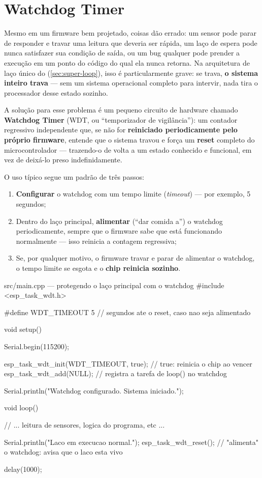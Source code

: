 \section{Watchdog Timer}
\label{sec:watchdog}

Mesmo em um firmware bem projetado, coisas dão errado: um sensor pode parar de responder e travar uma leitura que deveria ser rápida, um laço de espera pode nunca satisfazer sua condição de saída, ou um bug qualquer pode prender a execução em um ponto do código do qual ela nunca retorna. Na arquitetura de laço único do \ESP{} (\cref{sec:super-loop}), isso é particularmente grave: se  trava, \textbf{o sistema inteiro trava} — sem um sistema operacional completo para intervir, nada tira o processador desse estado sozinho.

A solução para esse problema é um pequeno circuito de hardware chamado \textbf{Watchdog Timer} (WDT, ou ``temporizador de vigilância''): um contador regressivo independente que, se não for \textbf{reiniciado periodicamente pelo próprio firmware}, entende que o sistema travou e força um \textbf{reset} completo do microcontrolador — trazendo-o de volta a um estado conhecido e funcional, em vez de deixá-lo preso indefinidamente.

O uso típico segue um padrão de três passos:

\begin{enumerate}
    \item \textbf{Configurar} o watchdog com um tempo limite (\emph{timeout}) — por exemplo, 5 segundos;
    \item Dentro do laço principal, \textbf{alimentar} (``dar comida a'') o watchdog periodicamente, sempre que o firmware sabe que está funcionando normalmente — isso reinicia a contagem regressiva;
    \item Se, por qualquer motivo, o firmware travar e parar de alimentar o watchdog, o tempo limite se esgota e o \textbf{chip reinicia sozinho}.
\end{enumerate}

\begin{codigoc}{src/main.cpp — protegendo o laço principal com o watchdog}
#include <esp_task_wdt.h>

#define WDT_TIMEOUT 5   // segundos ate o reset, caso nao seja alimentado

void setup() {
    Serial.begin(115200);

    esp_task_wdt_init(WDT_TIMEOUT, true);   // true: reinicia o chip ao vencer
    esp_task_wdt_add(NULL);                 // registra a tarefa de loop() no watchdog

    Serial.println("Watchdog configurado. Sistema iniciado.");
}

void loop() {
    // ... leitura de sensores, logica do programa, etc ...

    Serial.println("Laco em execucao normal.");
    esp_task_wdt_reset();   // "alimenta" o watchdog: avisa que o laco esta vivo

    delay(1000);
}
\end{codigoc}


